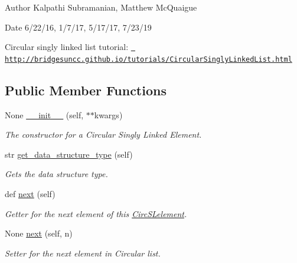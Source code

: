 \begin{DoxyAuthor}{Author}
Kalpathi Subramanian, Matthew Mc\+Quaigue
\end{DoxyAuthor}
\begin{DoxyDate}{Date}
6/22/16, 1/7/17, 5/17/17, 7/23/19
\end{DoxyDate}
Circular singly linked list tutorial\+: \href{http://bridgesuncc.github.io/tutorials/CircularSinglyLinkedList.html}{\texttt{ http\+://bridgesuncc.\+github.\+io/tutorials/\+Circular\+Singly\+Linked\+List.\+html}} \subsection*{Public Member Functions}
\begin{DoxyCompactItemize}
\item 
None \mbox{\hyperlink{classbridges_1_1circ__sl__element_1_1_circ_s_lelement_a3885ad93ae1368cfef8296ace0ab22c8}{\+\_\+\+\_\+init\+\_\+\+\_\+}} (self, $\ast$$\ast$kwargs)
\begin{DoxyCompactList}\small\item\em The constructor for a Circular Singly Linked Element. \end{DoxyCompactList}\item 
str \mbox{\hyperlink{classbridges_1_1circ__sl__element_1_1_circ_s_lelement_a417f0fa7de0f4d1017ca7a27870c45d3}{get\+\_\+data\+\_\+structure\+\_\+type}} (self)
\begin{DoxyCompactList}\small\item\em Gets the data structure type. \end{DoxyCompactList}\item 
def \mbox{\hyperlink{classbridges_1_1circ__sl__element_1_1_circ_s_lelement_a5abc123aa4a20414a02785f3b1cc342a}{next}} (self)
\begin{DoxyCompactList}\small\item\em Getter for the next element of this \mbox{\hyperlink{classbridges_1_1circ__sl__element_1_1_circ_s_lelement}{Circ\+S\+Lelement}}. \end{DoxyCompactList}\item 
None \mbox{\hyperlink{classbridges_1_1circ__sl__element_1_1_circ_s_lelement_a19e7629abd5d54b9471c5167f0395ec6}{next}} (self, n)
\begin{DoxyCompactList}\small\item\em Setter for the next element in Circular list. \end{DoxyCompactList}\end{DoxyCompactItemize}
